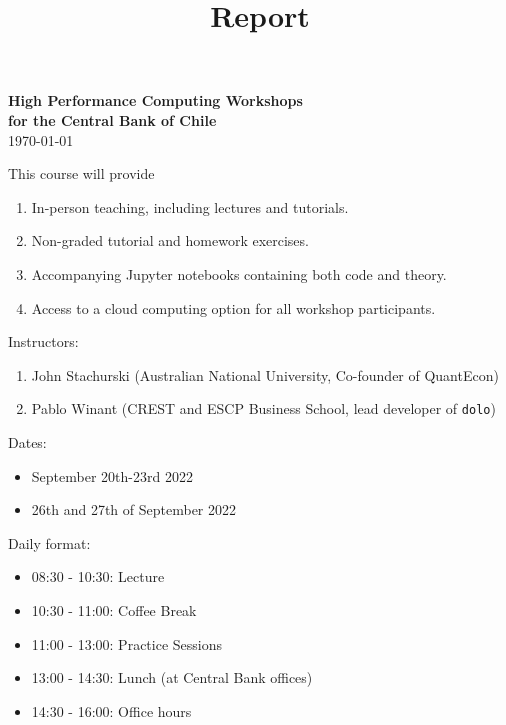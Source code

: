 \documentclass[12pt]{article}
\begin{document}
\title{Report}

\date{}


\begin{center}
    {\bf {\Large High Performance Computing Workshops \\
            for the Central Bank of Chile
    }}
    \\
    \bigskip
    \vspace{1em}
    \today
\end{center}


\vspace{.01in}







\thispagestyle{fancy}
This course will provide 
%
\begin{enumerate}
    \item In-person teaching, including lectures and tutorials.
    \item Non-graded tutorial and homework exercises.
    \item Accompanying Jupyter notebooks containing both code and theory.
    \item Access to a cloud computing option for all workshop participants.
\end{enumerate}

Instructors:
%
\begin{enumerate}
    \item John Stachurski (Australian National University, Co-founder of
        QuantEcon)
    \item Pablo Winant (CREST and ESCP Business School, lead developer of
        \texttt{dolo})
\end{enumerate}

Dates: 
%
\begin{itemize}
    \item September 20th-23rd 2022
    \item 26th and 27th of September 2022
\end{itemize}

Daily format:
%
\begin{itemize}
    \item 08:30 - 10:30: Lecture
    \item 10:30 - 11:00: Coffee Break
    \item 11:00 - 13:00: Practice Sessions
    \item 13:00 - 14:30: Lunch (at Central Bank offices)
    \item 14:30 - 16:00: Office hours
\end{itemize}
\end{document}

